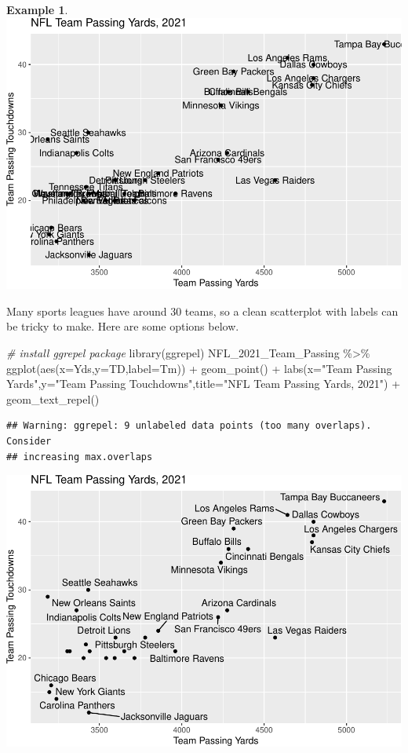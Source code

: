 \documentclass[
]{book}
\newenvironment{Shaded}{\begin{snugshade}}{\end{snugshade}}
\newcommand{\AttributeTok}[1]{\textcolor[rgb]{0.77,0.63,0.00}{#1}}
\newcommand{\CommentTok}[1]{\textcolor[rgb]{0.56,0.35,0.01}{\textit{#1}}}
\newcommand{\FunctionTok}[1]{\textcolor[rgb]{0.00,0.00,0.00}{#1}}
\newcommand{\NormalTok}[1]{#1}
\newcommand{\SpecialCharTok}[1]{\textcolor[rgb]{0.00,0.00,0.00}{#1}}
\newcommand{\StringTok}[1]{\textcolor[rgb]{0.31,0.60,0.02}{#1}}
\theoremstyle{definition}
\theoremstyle{definition}
\newtheorem{example}{Example}[chapter]
\theoremstyle{definition}
\theoremstyle{definition}
\theoremstyle{remark}
\begin{document}
\begin{example}
\includegraphics{series_files/figure-latex/scatter2-1.pdf}

Many sports leagues have around 30 teams, so a clean scatterplot with labels can be tricky to make. Here are some options below.

\begin{Shaded}
\begin{Highlighting}[]
\CommentTok{\# install ggrepel package}
\FunctionTok{library}\NormalTok{(ggrepel)}
\NormalTok{NFL\_2021\_Team\_Passing }\SpecialCharTok{\%\textgreater{}\%}
  \FunctionTok{ggplot}\NormalTok{(}\FunctionTok{aes}\NormalTok{(}\AttributeTok{x=}\NormalTok{Yds,}\AttributeTok{y=}\NormalTok{TD,}\AttributeTok{label=}\NormalTok{Tm)) }\SpecialCharTok{+} 
  \FunctionTok{geom\_point}\NormalTok{() }\SpecialCharTok{+}
  \FunctionTok{labs}\NormalTok{(}\AttributeTok{x=}\StringTok{"Team Passing Yards"}\NormalTok{,}\AttributeTok{y=}\StringTok{"Team Passing Touchdowns"}\NormalTok{,}\AttributeTok{title=}\StringTok{"NFL Team Passing Yards, 2021"}\NormalTok{) }\SpecialCharTok{+}
  \FunctionTok{geom\_text\_repel}\NormalTok{()}
\end{Highlighting}
\end{Shaded}

\begin{verbatim}
## Warning: ggrepel: 9 unlabeled data points (too many overlaps). Consider
## increasing max.overlaps
\end{verbatim}

\includegraphics{series_files/figure-latex/scatter3-1.pdf}


\end{example}
\end{document}
